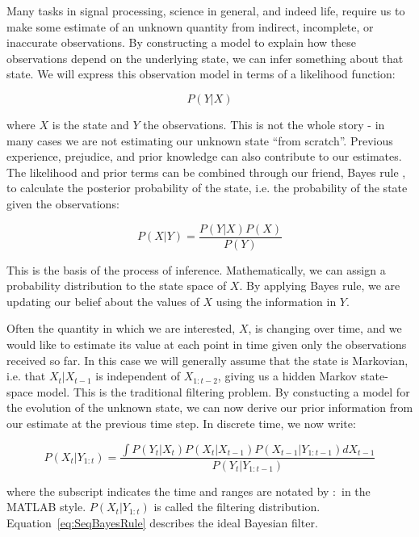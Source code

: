 Many tasks in signal processing, science in general, and indeed life, require us to make some estimate of an unknown quantity from indirect, incomplete, or inaccurate observations. By constructing a model to explain how these observations depend on the underlying state, we can infer something about that state. We will express this observation model in terms of a likelihood function:

\begin{equation}
P(Y|X)
\label{eq:LH}
\end{equation}

where $X$ is the state and $Y$ the observations. This is not the whole story - in many cases we are not estimating our unknown state ``from scratch''. Previous experience, prejudice, and prior knowledge can also contribute to our estimates. The likelihood and prior terms can be combined through our friend, Bayes rule \cite{Bayes1763, Laplace1774}, to calculate the posterior probability of the state, i.e. the probability of the state given the observations:

\begin{equation}
P(X|Y) = \frac{P(Y|X)P(X)}{P(Y)}
\label{eq:BayesRule}
\end{equation}

This is the basis of the process of inference. Mathematically, we can assign a probability distribution to the state space of $X$. By applying Bayes rule, we are updating our belief about the values of $X$ using the information in $Y$.

Often the quantity in which we are interested, $X$, is changing over time, and we would like to estimate its value at each point in time given only the observations received so far. In this case we will generally assume that the state is Markovian, i.e. that $X_t|X_{t-1}$ is independent of $X_{1:t-2}$, giving us a hidden Markov state-space model. This is the traditional filtering problem. By constucting a model for the evolution of the unknown state, we can now derive our prior information from our estimate at the previous time step. In discrete time, we now write:

\begin{equation}
P(X_t|Y_{1:t}) = \frac{\int P(Y_t|X_t)P(X_t|X_{t-1})P(X_{t-1}|Y_{1:t-1}) dX_{t-1}}{P(Y_t|Y_{1:t-1})}
\label{eq:SeqBayesRule}
\end{equation}

where the subscript indicates the time and ranges are notated by $:$ in the MATLAB style. $P(X_t|Y_{1:t})$ is called the filtering distribution. Equation~\ref{eq:SeqBayesRule} describes the ideal Bayesian filter.

